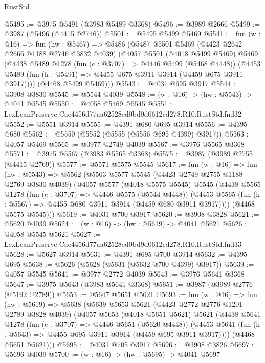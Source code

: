 \begin{lexlean}{RustStd}
\begin{coremodule}
@5495 := @3975 @5491 (@3983 @5489 @3368)
@5496 := @3989 @2666
@5499 := @3987 (@5496 (@4415 @2746))
@5501 := @5495 @5499 @5469
@5541 := fun (w : @16) =>
  fun (hw : @5467) =>
  @5486
    (@5487
      @5501
      @5469
      (@4423 @2642 @2666 @1188 @2746 @3832 @4039)
      (@4057
        @5501
        (@4018 @5499 @5469)
        @5469
        (@4438
          @5489
          @1278
          (fun (c : @3707) => @4446 @5499 (@5468 @4448))
          (@4453 @5489 (fun (h : @5491) => @4455 @675 @3911 @3914 (@4459 @675 @3911 @3917))))
        (@4468 @5499 @5469)))
@5543 := @4031 @695 @3917
@5544 := @3908 @3830
@5545 := @5544 @4039
@5548 := (w : @16) -> (hw : @5543) -> @4041 @5545
@5550 := @4058 @5469 @5545
@5551 := LexLeanPreserve.Cae4456d77aa62528ed0bd9d0612cd278.R10.RustStd.fnd32
@5552 := @5551 @3914
@5555 := @4391 @680 @695 @3914
@5556 := @4395 @680
@5562 := @5550 (@5552 (@5555 (@5556 @695 @4399) @3917))
@5563 := @4057 @5469
@5565 := @3977 @2749 @4039
@5567 := @3976 @5565 @3368
@5571 := @3975 @5567 (@3983 @5565 @3368)
@5575 := @3987 (@3989 @2755 (@4415 @2769))
@5577 := @5571 @5575 @5545
@5617 := fun (w : @16) =>
  fun (hw : @5543) =>
  @5562
    (@5563
      @5577
      @5545
      (@4423 @2749 @2755 @1188 @2769 @3830 @4039)
      (@4057
        @5577
        (@4018 @5575 @5545)
        @5545
        (@4438
          @5565
          @1278
          (fun (c : @3707) => @4446 @5575 (@5544 @4448))
          (@4453 @5565 (fun (h : @5567) => @4455 @680 @3911 @3914 (@4459 @680 @3911 @3917))))
        (@4468 @5575 @5545)))
@5619 := @4031 @700 @3917
@5620 := @3908 @3828
@5621 := @5620 @4039
@5624 := (w : @16) -> (hw : @5619) -> @4041 @5621
@5626 := @4058 @5545 @5621
@5627 := LexLeanPreserve.Cae4456d77aa62528ed0bd9d0612cd278.R10.RustStd.fnd33
@5628 := @5627 @3914
@5631 := @4391 @695 @700 @3914
@5632 := @4395 @695
@5638 := @5626 (@5628 (@5631 (@5632 @700 @4399) @3917))
@5639 := @4057 @5545
@5641 := @3977 @2772 @4039
@5643 := @3976 @5641 @3368
@5647 := @3975 @5643 (@3983 @5641 @3368)
@5651 := @3987 (@3989 @2776 (@5192 @2789))
@5653 := @5647 @5651 @5621
@5693 := fun (w : @16) =>
  fun (hw : @5619) =>
  @5638
    (@5639
      @5653
      @5621
      (@4423 @2772 @2776 @1201 @2789 @3828 @4039)
      (@4057
        @5653
        (@4018 @5651 @5621)
        @5621
        (@4438
          @5641
          @1278
          (fun (c : @3707) => @4446 @5651 (@5620 @4448))
          (@4453 @5641 (fun (h : @5643) => @4455 @695 @3911 @3914 (@4459 @695 @3911 @3917))))
        (@4468 @5651 @5621)))
@5695 := @4031 @705 @3917
@5696 := @3908 @3826
@5697 := @5696 @4039
@5700 := (w : @16) -> (hw : @5695) -> @4041 @5697

\end{coremodule}
\end{lexlean}
